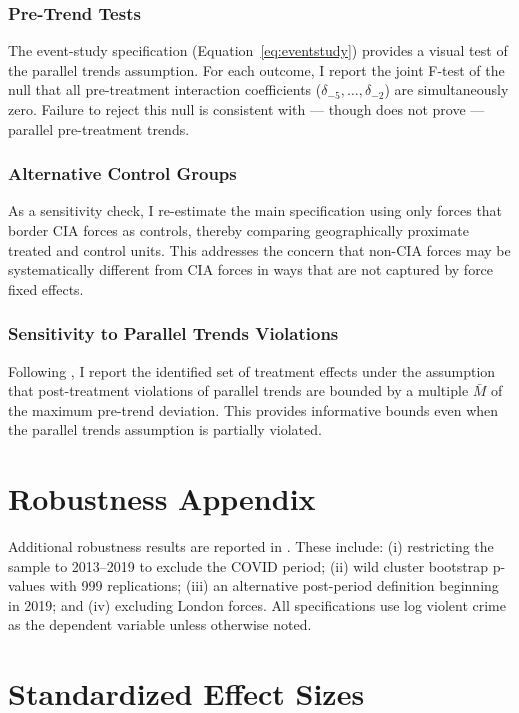 \documentclass[12pt]{article}
\begin{document}
\subsubsection*{Pre-Trend Tests} The event-study specification (Equation~\ref{eq:eventstudy}) provides a visual test of the parallel trends assumption. For each outcome, I report the joint F-test of the null that all pre-treatment interaction coefficients ($\delta_{-5}, \ldots, \delta_{-2}$) are simultaneously zero. Failure to reject this null is consistent with --- though does not prove --- parallel pre-treatment trends.

\subsubsection*{Alternative Control Groups} As a sensitivity check, I re-estimate the main specification using only forces that border CIA forces as controls, thereby comparing geographically proximate treated and control units. This addresses the concern that non-CIA forces may be systematically different from CIA forces in ways that are not captured by force fixed effects.

\subsubsection*{Sensitivity to Parallel Trends Violations} Following \citet{rambachan2023more}, I report the identified set of treatment effects under the assumption that post-treatment violations of parallel trends are bounded by a multiple $\bar{M}$ of the maximum pre-trend deviation. This provides informative bounds even when the parallel trends assumption is partially violated.

\section{Robustness Appendix}
\label{app:robustness}

Additional robustness results are reported in . These include: (i) restricting the sample to 2013--2019 to exclude the COVID period; (ii) wild cluster bootstrap p-values with 999 replications; (iii) an alternative post-period definition beginning in 2019; and (iv) excluding London forces. All specifications use log violent crime as the dependent variable unless otherwise noted.

\section{Standardized Effect Sizes}
\label{sec:sde}


\end{document}

